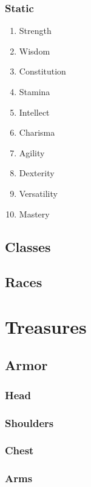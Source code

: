 \documentclass[10pt,oneside,x11names]{article}
\begin{document}
\subsubsection{Static}
\label{sec:orgheadline76}
\begin{enumerate}
\item Strength
\label{sec:orgheadline66}
\item Wisdom
\label{sec:orgheadline67}
\item Constitution
\label{sec:orgheadline68}
\item Stamina
\label{sec:orgheadline69}
\item Intellect
\label{sec:orgheadline70}
\item Charisma
\label{sec:orgheadline71}
\item Agility
\label{sec:orgheadline72}
\item Dexterity
\label{sec:orgheadline73}
\item Versatility
\label{sec:orgheadline74}
\item Mastery
\label{sec:orgheadline75}
\end{enumerate}
\subsection{Classes}
\label{sec:orgheadline78}
\subsection{Races}
\label{sec:orgheadline79}
\section{Treasures}
\label{sec:orgheadline110}
\subsection{Armor}
\label{sec:orgheadline92}
\subsubsection{Head}
\label{sec:orgheadline81}
\subsubsection{Shoulders}
\label{sec:orgheadline82}
\subsubsection{Chest}
\label{sec:orgheadline83}
\subsubsection{Arms}
\label{sec:orgheadline84}
\end{document}

